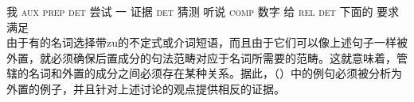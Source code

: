      我 \textsc{aux} \spacebr{}\textsc{prep} \spacebr{}\textsc{det} 尝试 \spacebr{}一 证据 \spacebr{}\textsc{det} 猜测 {} 听说 \spacebr{}\textsc{comp} \expl{} 数字 给 \textsc{rel} \textsc{det} 下面的 要求 满足\\
\zl
由于有的名词选择带zu的不定式或介词短语，而且由于它们可以像上述句子一样被外置，就必须确保后置成分的句法范畴对应于名词所需要的范畴。这就意味着，管辖的名词和外置的成分之间必须存在某种关系。据此，（）中的例句必须被分析为外置的例子，并且针对上述讨论的观点提供相反的证据。 


